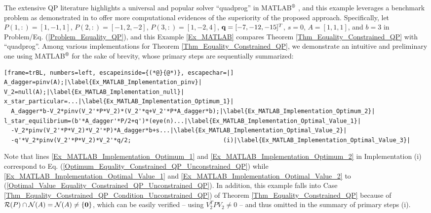 \documentclass{imaman}
\newcommand{\bfq}{{\bf q}}
\newcommand{\bfzero}{{\bf 0}}
\newcommand{\calN}{{\mathcal N}}
\newcommand{\calR}{{\mathcal R}}
\numberwithin{equation}{section}
\begin{document}
\begin{example}
The extensive QP literature highlights a universal and popular solver ``quadprog'' in MATLAB$\textsuperscript{\textregistered}$ \cite{TsMa:21}, and this example leverages a benchmark problem as demonstrated in \cite{MATLAB} to offer more computational evidences of the superiority of the proposed approach. Specifically, let $P(1,:)=[1,-1,1]$, $P(2,:)=[-1,2,-2]$, $P(3,:)=[1,-2,4]$, $\bfq=[-7,-12,-15]^T$, $s=0$, $A=[1,1,1]$, and $b=3$ in Problem/Eq. (\ref{Problem_Equality_QP}), and this Example \ref{Ex_MATLAB} compares Theorem \ref{Thm_Equality_Constrained_QP} with ``quadprog''. Among various implementations for Theorem \ref{Thm_Equality_Constrained_QP}, we demonstrate an intuitive and preliminary one using MATLAB$\textsuperscript{\textregistered}$ for the sake of brevity, whose primary steps are sequentially summarized:

\vspace{0.2cm}\begin{minipage}{0.95\textwidth}
\begin{lstlisting}[frame=trBL, numbers=left, escapeinside={(*@}{@*)}, escapechar=|]
A_dagger=pinv(A);|\label{Ex_MATLAB_Implementation_pinv}|
V_2=null(A);|\label{Ex_MATLAB_Implementation_null}|
x_star_particular=...|\label{Ex_MATLAB_Implementation_Optimum_1}|
  A_dagger*b-V_2*pinv(V_2'*P*V_2)*(V_2'*q+V_2'*P*A_dagger*b);|\label{Ex_MATLAB_Implementation_Optimum_2}|
l_star_equilibrium=(b'*A_dagger'*P/2+q')*(eye(n)...|\label{Ex_MATLAB_Implementation_Optimal_Value_1}|
  -V_2*pinv(V_2'*P*V_2)*V_2'*P)*A_dagger*b+s...|\label{Ex_MATLAB_Implementation_Optimal_Value_2}|
  -q'*V_2*pinv(V_2'*P*V_2)*V_2'*q/2;                          (i)|\label{Ex_MATLAB_Implementation_Optimal_Value_3}|
\end{lstlisting}
\end{minipage}

\noindent Note that lines \ref{Ex_MATLAB_Implementation_Optimum_1} and \ref{Ex_MATLAB_Implementation_Optimum_2} in Implementation (i) correspond to Eq. (\ref{Optimum_Equality_Constrained_QP_Unconstrained_QP}) while \ref{Ex_MATLAB_Implementation_Optimal_Value_1} and \ref{Ex_MATLAB_Implementation_Optimal_Value_2} to (\ref{Optimal_Value_Equality_Constrained_QP_Unconstrained_QP}). In addition, this example falls into Case \ref{Thm_Equality_Constrained_QP_Condition_Unconstrained_QP}) of Theorem \ref{Thm_Equality_Constrained_QP} because of $\calR(P)\cap\calN(A)=\calN(A)\ne\{\bfzero\}$, which can be easily verified -- using $V_2^TPV_2\ne 0$ -- and thus omitted in the summary of primary steps (i).


\end{example}
\end{document}
